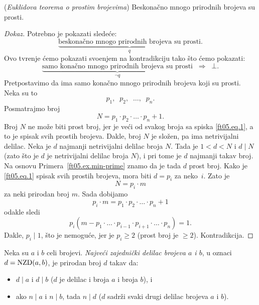 \begin{EX} (\emph{Euklidova teorema o prostim brojevima})
  Beskona\v cno mnogo prirodnih brojeva su prosti.
\end{EX}
\begin{proof}[Dokaz]
  Potrebno je pokazati slede\'ce:
  $$
    \underbrace{\text{beskona\v cno mnogo prirodnih brojeva su prosti}}_q.
  $$
  Ovo tvr\dj enje \'cemo pokazati svo\dj enjem na kontradikciju tako \v sto \'cemo pokazati:
  $$
    \underbrace{\text{samo kona\v cno mnogo prirodnih brojeva su prosti}}_{\lnot q}
    \;\;\Rightarrow\;\; \bot.
  $$
  Pretpostavimo da ima samo kona\v cno mnogo prirodnih brojeva koji su prosti. Neka su to
  \begin{equation}\label{ft05.eq.1}
    p_1,\;\; p_2,\;\; \ldots,\;\; p_n.
  \end{equation}
  Posmatrajmo broj
  $$
    N = p_1 \cdot p_2 \cdot \ldots \cdot p_n + 1.
  $$
  Broj $N$ ne mo\v ze biti prost broj, jer je ve\'ci od svakog broja sa spiska \eqref{ft05.eq.1}, a to je spisak svih prostih brojeva.
  Dakle, broj $N$ je slo\v zen, pa ima netrivijalni delilac. Neka je $d$ najmanji netrivijalni delilac broja $N$.
  Tada je $1 < d < N$ i $d \mid N$ (zato \v sto je $d$ je netrivijalni delilac broja $N$), i pri tome je $d$ najmanji takav broj.
  Na osnovu Primera~\ref{ft05.ex.min-prime} znamo da je tada $d$ prost broj. Kako je \eqref{ft05.eq.1} spisak svih
  prostih brojeva, mora biti $d = p_i$ za neko~$i$. Zato je
  $$
    N = p_i \cdot m
  $$
  za neki prirodan broj $m$. Sada dobijamo
  $$
    p_i \cdot m = p_1 \cdot p_2 \cdot \ldots \cdot p_n + 1
  $$
  odakle sledi
  $$
    p_i (m - p_1 \cdot \ldots \cdot p_{i-1} \cdot p_{i+1} \cdot \ldots \cdot p_n) = 1.
  $$
  Dakle, $p_i \mid 1$, \v sto je nemogu\'ce, jer je $p_i \ge 2$ (prost broj je $\ge 2$). Kontradikcija.
\end{proof}

\begin{DEF}
  Neka su $a$ i $b$ celi brojevi. \emph{Najve\'ci zajedni\v cki delilac brojeva $a$ i $b$},
  u oznaci $d = \mathrm{NZD}(a, b)$, je prirodan broj $d$ takav da:
  \begin{itemize}
  \item $d \mid a$ i $d \mid b$ ($d$ je delilac i broja $a$ i broja $b$), i
  \item ako $n \mid a$ i $n \mid b$, tada $n \mid d$ ($d$ sadr\v zi svaki drugi delilac brojeva $a$ i $b$).
  \end{itemize}
\end{DEF}


